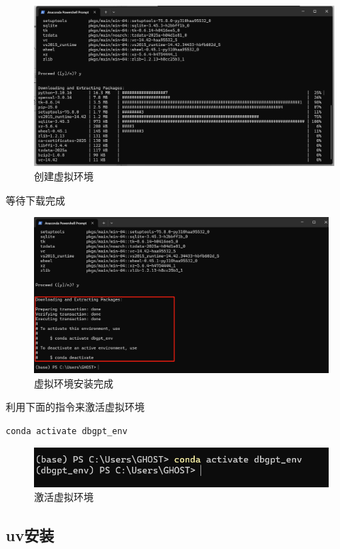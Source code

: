 \documentclass{article}
\begin{document}
	\begin{figure}[H]
		\centering
		\includegraphics[width=12cm]{./images/2.创建虚拟环境.png}
		\caption{创建虚拟环境}
	\end{figure}
	
	等待下载完成
	
	\begin{figure}[H]
		\centering
		\includegraphics[width=11cm]{./images/3.虚拟环境安装完成.png}
		\caption{虚拟环境安装完成}
	\end{figure}
	
	利用下面的指令来激活虚拟环境
	
	\begin{lstlisting}[language=bash, title=激活虚拟环境, tabsize=4]
	conda activate dbgpt_env
	\end{lstlisting}
	
	\begin{figure}[H]
		\centering
		\includegraphics[width=11cm]{./images/4.激活虚拟环境.png}
		\caption{激活虚拟环境}
	\end{figure}
	
	\subsection{uv安装}
	
\end{document}
